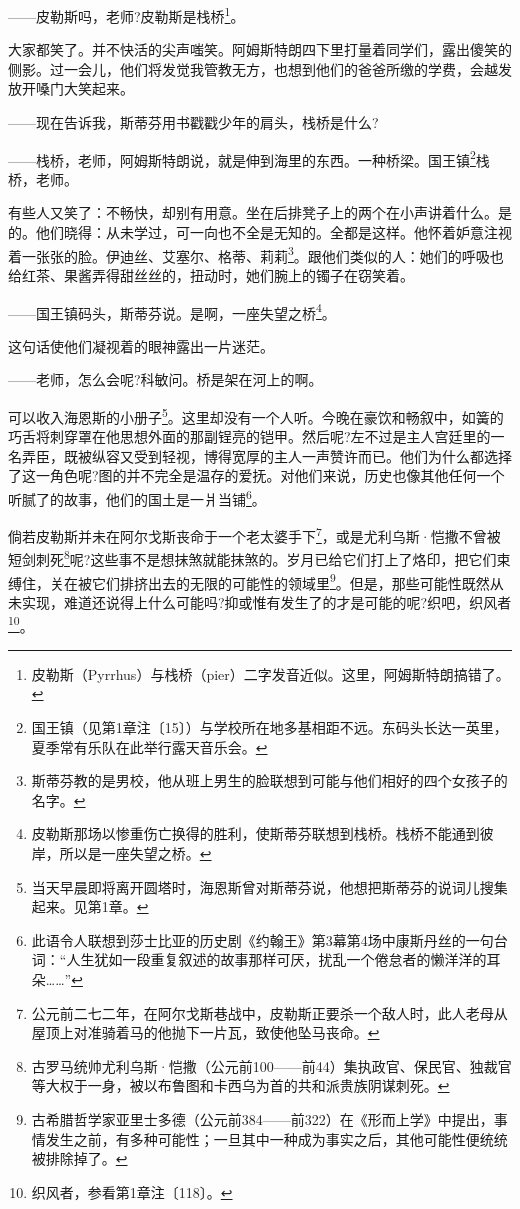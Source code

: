 \par ——皮勒斯吗，老师?皮勒斯是栈桥\footnote{皮勒斯（Pyrrhus）与栈桥（pier）二字发音近似。这里，阿姆斯特朗搞错了。}。
\par 大家都笑了。并不快活的尖声嗤笑。阿姆斯特朗四下里打量着同学们，露出傻笑的侧影。过一会儿，他们将发觉我管教无方，也想到他们的爸爸所缴的学费，会越发放开嗓门大笑起来。
\par ——现在告诉我，斯蒂芬用书戳戳少年的肩头，栈桥是什么?
\par ——栈桥，老师，阿姆斯特朗说，就是伸到海里的东西。一种桥梁。国王镇\footnote{国王镇（见第1章注〔15〕）与学校所在地多基相距不远。东码头长达一英里，夏季常有乐队在此举行露天音乐会。}栈桥，老师。
\par 有些人又笑了：不畅快，却别有用意。坐在后排凳子上的两个在小声讲着什么。是的。他们晓得：从未学过，可一向也不全是无知的。全都是这样。他怀着妒意注视着一张张的脸。伊迪丝、艾塞尔、格蒂、莉莉\footnote{斯蒂芬教的是男校，他从班上男生的脸联想到可能与他们相好的四个女孩子的名字。}。跟他们类似的人：她们的呼吸也给红茶、果酱弄得甜丝丝的，扭动时，她们腕上的镯子在窃笑着。
\par ——国王镇码头，斯蒂芬说。是啊，一座失望之桥\footnote{皮勒斯那场以惨重伤亡换得的胜利，使斯蒂芬联想到栈桥。栈桥不能通到彼岸，所以是一座失望之桥。}。
\par 这句话使他们凝视着的眼神露出一片迷茫。
\par ——老师，怎么会呢?科敏问。桥是架在河上的啊。
\par 可以收入海恩斯的小册子\footnote{当天早晨即将离开圆塔时，海恩斯曾对斯蒂芬说，他想把斯蒂芬的说词儿搜集起来。见第1章。}。这里却没有一个人听。今晚在豪饮和畅叙中，如簧的巧舌将刺穿罩在他思想外面的那副锃亮的铠甲。然后呢?左不过是主人宫廷里的一名弄臣，既被纵容又受到轻视，博得宽厚的主人一声赞许而已。他们为什么都选择了这一角色呢?图的并不完全是温存的爱抚。对他们来说，历史也像其他任何一个听腻了的故事，他们的国土是一爿当铺\footnote{此语令人联想到莎士比亚的历史剧《约翰王》第3幕第4场中康斯丹丝的一句台词：“人生犹如一段重复叙述的故事那样可厌，扰乱一个倦怠者的懒洋洋的耳朵……”}。
\par 倘若皮勒斯并未在阿尔戈斯丧命于一个老太婆手下\footnote{公元前二七二年，在阿尔戈斯巷战中，皮勒斯正要杀一个敌人时，此人老母从屋顶上对准骑着马的他抛下一片瓦，致使他坠马丧命。}，或是尤利乌斯·恺撒不曾被短剑刺死\footnote{古罗马统帅尤利乌斯·恺撒（公元前100——前44）集执政官、保民官、独裁官等大权于一身，被以布鲁图和卡西乌为首的共和派贵族阴谋刺死。}呢?这些事不是想抹煞就能抹煞的。岁月已给它们打上了烙印，把它们束缚住，关在被它们排挤出去的无限的可能性的领域里\footnote{古希腊哲学家亚里士多德（公元前384——前322）在《形而上学》中提出，事情发生之前，有多种可能性；一旦其中一种成为事实之后，其他可能性便统统被排除掉了。}。但是，那些可能性既然从未实现，难道还说得上什么可能吗?抑或惟有发生了的才是可能的呢?织吧，织风者\footnote{织风者，参看第1章注〔118〕。}。
